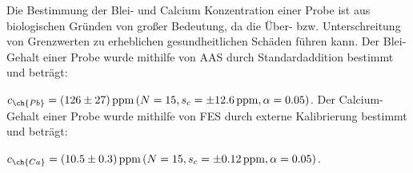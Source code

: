 Die Bestimmung der Blei- und Calcium Konzentration einer Probe ist aus biologischen Gründen von großer Bedeutung, da die Über- bzw. Unterschreitung von Grenzwerten zu erheblichen gesundheitlichen Schäden führen kann. Der Blei-Gehalt einer Probe wurde mithilfe von AAS durch Standardaddition bestimmt und beträgt: 

\noindent $c_{\ch{Pb}} = \SI[mode=text, multi-part-units = brackets, separate-uncertainty]{126(27)}{ppm} \left(N = 15, s_c = \pm \SI[mode=text]{12.6}{ppm}, \alpha = 0.05\right)$. Der Calcium-Gehalt einer Probe wurde mithilfe von FES durch externe Kalibrierung bestimmt und beträgt: 

\noindent $c_{\ch{Ca}} = \SI[mode=text, multi-part-units = brackets, separate-uncertainty]{10.5(3)}{ppm} \left(N = 15, s_c = \pm \SI[mode=text]{0.12}{ppm}, \alpha = 0.05\right)$.